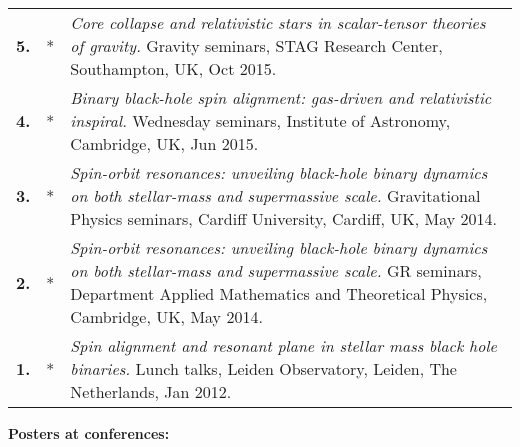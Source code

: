 \documentclass[a4paper]{moderncv}
\begin{document}
{\begin{longtable}{rp{0.4cm}p{15.8cm}}
%
\textbf{5.} & *& \textit{Core collapse and relativistic stars in scalar-tensor theories of gravity.}
\newline{} 
Gravity seminars, STAG Research Center, Southampton, UK, Oct 2015.
\vspace{0.05cm}\\
%
\textbf{4.} & *& \textit{Binary black-hole spin alignment: gas-driven and relativistic inspiral.}
\newline{} 
Wednesday seminars, Institute of Astronomy, Cambridge, UK, Jun 2015.\vspace{0.05cm}\\
%
\textbf{3.} & *& \textit{Spin-orbit resonances: unveiling black-hole binary dynamics on both stellar-mass and supermassive scale.}
\newline{} 
Gravitational Physics seminars, Cardiff University, Cardiff, UK, May 2014.
\vspace{0.05cm}\\
%
\textbf{2.} & *& \textit{Spin-orbit resonances: unveiling black-hole binary dynamics on both stellar-mass and supermassive scale.}
\newline{} 
GR seminars, Department Applied Mathematics and Theoretical Physics, Cambridge, UK, May 2014.
\vspace{0.05cm}\\
%
\textbf{1.} & *& \textit{Spin alignment and resonant plane in stellar mass black hole binaries.}
\newline{} 
Lunch talks, Leiden Observatory, Leiden, The Netherlands, Jan 2012.
\vspace{0.05cm}\\
%
\end{longtable}
}


\textcolor{color1}{\textbf{Posters at conferences:}}
\end{document}
